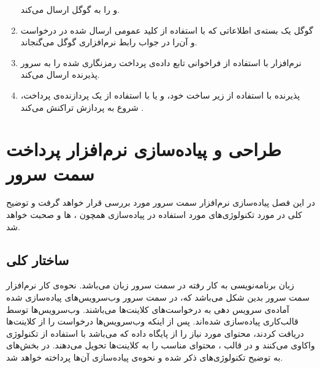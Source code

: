 \documentclass[oneside]{report}
\begin{document}
\begin{enumerate}
	     و 
	          {\normalsize {}} 
	          را به گوگل ارسال می‌کند. 
	 \item
	 گوگل یک بسته‌ی اطلاعاتی که با استفاده از کلید عمومی ارسال شده در درخواست
	      {\normalsize {}}
	       و آن‌را در جواب رابط نرم‌افزاری گوگل می‌گنجاند. 
	  \item
	  نرم‌افزار 
	       {\normalsize {}}      
	       با استفاده از فراخوانی تابع
	            {\normalsize {}} 
	               داده‌ی پرداخت رمزنگاری شده را به سرور پذیرنده ارسال می‌کند.
	   \item
	   پذیرنده با استفاده از زیر ساخت خود، و یا با استفاده از 
     {\normalsize {}}
     یک پردازنده‌ی پرداخت، شروع به پردازش تراکنش می‌کند
          \cite{androidpay} .        
     \end{enumerate}      	
     

		
		
		\chapter{طراحی و پیاده‌سازی نرم‌افزار پرداخت سمت سرور}\label{serverimplementation}
در این فصل پیاده‌سازی نرم‌افزار سمت سرور 
 مورد بررسی قرار خواهد گرفت و توضیح کلی در مورد تکنولوژی‌های مورد استفاده در پیاده‌سازی همچون 
         {\normalsize {}}،
                  {\normalsize {}} ها
                  و 
                           {\normalsize {}}
                              صحبت خواهد شد. 
                              
   \section{ساختار کلی}                
  زبان برنامه‌نویسی به کار رفته در سمت سرور زبان
  {\normalsize{}}
  می‌باشد.
  نحوه‌ی کار نرم‌افزار سمت سرور بدین شکل می‌باشد که،  در سمت سرور وب‌سرویس‌های پیاده‌سازی شده 
  آماده‌ی سرویس دهی به درخواست‌های کلاینت‌ها می‌باشند. وب‌سرویس‌ها توسط قالب‌کاری 
           {\normalsize {}} 
   پیاده‌سازی شده‌اند. پس از اینکه وب‌سرویس‌ها درخواست را از کلاینت‌ها دریافت کردند، 
   محتوای مورد نیاز را از پایگاه داده که 
            {\normalsize {}} 
            می‌باشد با استفاده از تکنولوژی                                     
                     {\normalsize {}} 
واکاوی می‌کنند و در قالب
         {\normalsize {}}،       
         محتوای مناسب را به کلاینت‌ها تحویل می‌دهند. 
		در بخش‌های به توضیح تکنولوژی‌های ذکر شده و نحوه‌ی پیاده‌سازی آن‌ها پرداخته خواهد شد.
		
\end{document}
